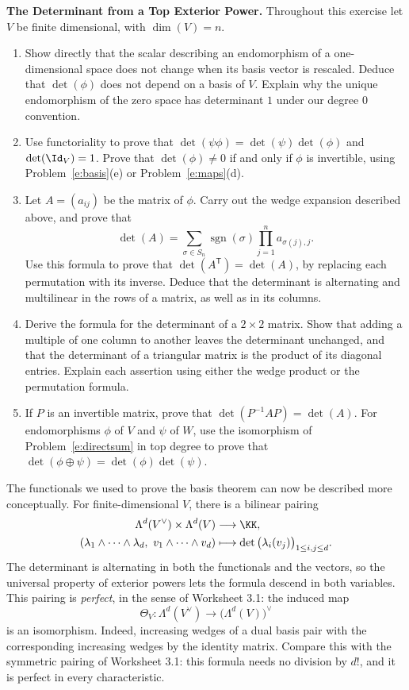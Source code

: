 \documentclass[12pt,reqno]{amsart}
\DeclareMathOperator{\sgn}{sgn}
\begin{document}
\begin{problems}
\item\label{e:determinant} \textbf{The Determinant from a Top Exterior Power.} Throughout this exercise let $V$ be finite dimensional, with $\dim(V)=n$.
\begin{enumerate}
\item Show directly that the scalar describing an endomorphism of a one-dimensional space does not change when its basis vector is rescaled. Deduce that $\det(\phi)$ does not depend on a basis of $V$. Explain why the unique endomorphism of the zero space has determinant $1$ under our degree $0$ convention.
\item Use functoriality to prove that $\det(\psi\phi)=\det(\psi)\det(\phi)$ and $\det(\Id_V)=1$. Prove that $\det(\phi)\ne0$ if and only if $\phi$ is invertible, using Problem~\ref{e:basis}(e) or Problem~\ref{e:maps}(d).
\item Let $A=(a_{ij})$ be the matrix of $\phi$. Carry out the wedge expansion described above, and prove that
\[
\det(A)=\sum_{\sigma\in S_n}\sgn(\sigma)\prod_{j=1}^na_{\sigma(j),j}.
\]
Use this formula to prove that $\det(A^{\mathsf T})=\det(A)$, by replacing each permutation with its inverse. Deduce that the determinant is alternating and multilinear in the rows of a matrix, as well as in its columns.
\item Derive the formula for the determinant of a $2\times2$ matrix. Show that adding a multiple of one column to another leaves the determinant unchanged, and that the determinant of a triangular matrix is the product of its diagonal entries. Explain each assertion using either the wedge product or the permutation formula.
\item If $P$ is an invertible matrix, prove that $\det(P^{-1}AP)=\det(A)$. For endomorphisms $\phi$ of $V$ and $\psi$ of $W$, use the isomorphism of Problem~\ref{e:directsum} in top degree to prove that $\det(\phi\oplus\psi)=\det(\phi)\det(\psi)$.
\end{enumerate}
\end{problems}

\hrulefill

The functionals we used to prove the basis theorem can now be described more conceptually. For finite-dimensional $V$, there is a bilinear pairing
\[
\begin{aligned}
\Lambda^d(V^{\vee})\times\Lambda^d(V)&\longrightarrow\KK,\\
(\lambda_1\wedge\cdots\wedge\lambda_d,\ v_1\wedge\cdots\wedge v_d)&\longmapsto\det\big(\lambda_i(v_j)\big)_{1\leq i,j\leq d}.
\end{aligned}
\]
The determinant is alternating in both the functionals and the vectors, so the universal property of exterior powers lets the formula descend in both variables. This pairing is \emph{perfect}, in the sense of Worksheet 3.1: the induced map
\[
\Theta_V:\Lambda^d(V^{\vee})\longrightarrow\big(\Lambda^d(V)\big)^{\vee}
\]
is an isomorphism. Indeed, increasing wedges of a dual basis pair with the corresponding increasing wedges by the identity matrix. Compare this with the symmetric pairing of Worksheet 3.1: this formula needs no division by $d!$, and it is perfect in every characteristic.
\end{document}
